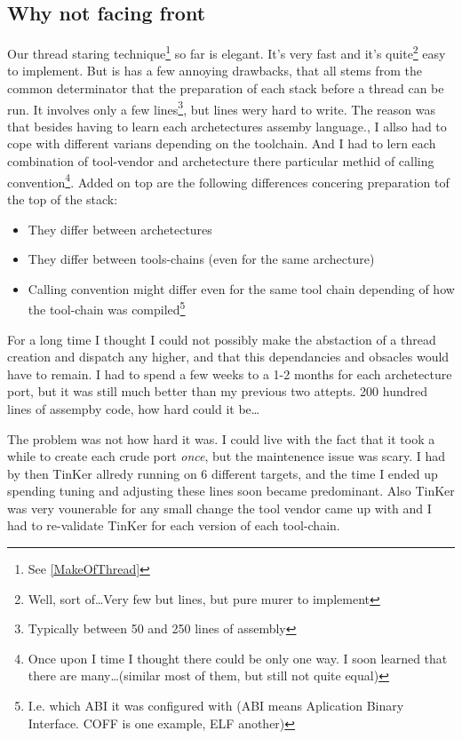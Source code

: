 {	\subsection{Why not facing front}
		Our thread staring technique\footnote{See \ref{MakeOfThread}} so far is elegant. It's very fast and it's quite\footnote{Well, sort of\ldots Very few but lines, but pure murer to implement} easy to implement. But is has a few annoying drawbacks, that all stems from the common determinator that the preparation of each stack before a thread can be run. It involves only a few lines\footnote{Typically between 50 and 250 lines of assembly}, but lines wery hard to write. The reason was that besides having to learn each archetectures assemby language., I allso had to cope with different varians depending on the toolchain. And I had to lern each combination of tool-vendor and archetecture there particular methid of calling convention\footnote{Once upon I time I thought there could be only one way. I soon learned that there are many\ldots (similar most of them, but still not quite equal)}. Added on top are the following differences concering preparation tof the top of the stack:
		\begin{itemize}
			\item They differ between archetectures
			\item They differ between tools-chains (even for the same archecture)
			\item Calling convention might differ even for the same tool chain depending of how the tool-chain was compiled\footnote{I.e. which ABI it was configured with (ABI means Aplication Binary Interface. COFF is one example, ELF another)}
		\end{itemize}
		For a long time I thought I could not possibly make the abstaction of a thread creation and dispatch any higher, and that this dependancies and obsacles would have to remain. I had to spend a few weeks to a 1-2 months for each archetecture port, but it was still much better than my previous two attepts. 200 hundred lines of assempby code, how hard could it be\ldots

		The problem was not how hard it was. I could live with the fact that it took a while to create each crude port \textit{once}, but the maintenence issue was scary. I had by then TinKer allredy running on 6 different targets, and the time I ended up spending tuning and adjusting these lines soon became predominant. Also TinKer was very vounerable for any small change the tool vendor came up with and I had to re-validate TinKer for each version of each tool-chain.

}
